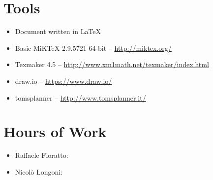 \newpage
\begin{appendices}
\section{Tools}
\begin{itemize}
	\item Document written in \LaTeX
	\item Basic MiKTeX 2.9.5721 64-bit -- \url{http://miktex.org/}
	\item Texmaker 4.5 -- \url{http://www.xm1math.net/texmaker/index.html}
	\item draw.io -- \url{https://www.draw.io/}
	\item tomsplanner -- \url{http://www.tomsplanner.it/}
\end{itemize}
\break
\section{Hours of Work}
\begin{itemize}
	\item Raffaele Fioratto: 
	\item Nicol\`{o} Longoni: 
\end{itemize}
\end{appendices}